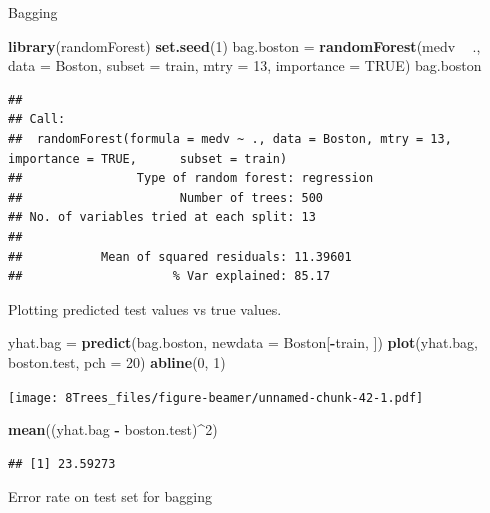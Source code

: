 \documentclass[10pt,ignorenonframetext,]{beamer}
\newenvironment{Shaded}{\begin{snugshade}}{\end{snugshade}}
\newcommand{\KeywordTok}[1]{\textcolor[rgb]{0.13,0.29,0.53}{\textbf{#1}}}
\newcommand{\DataTypeTok}[1]{\textcolor[rgb]{0.13,0.29,0.53}{#1}}
\newcommand{\DecValTok}[1]{\textcolor[rgb]{0.00,0.00,0.81}{#1}}
\newcommand{\StringTok}[1]{\textcolor[rgb]{0.31,0.60,0.02}{#1}}
\newcommand{\OtherTok}[1]{\textcolor[rgb]{0.56,0.35,0.01}{#1}}
\newcommand{\OperatorTok}[1]{\textcolor[rgb]{0.81,0.36,0.00}{\textbf{#1}}}
\newcommand{\NormalTok}[1]{#1}
\begin{document}
\begin{frame}[fragile]

\begin{block}{Bagging}

\begin{Shaded}
\begin{Highlighting}[]
\KeywordTok{library}\NormalTok{(randomForest)}
\KeywordTok{set.seed}\NormalTok{(}\DecValTok{1}\NormalTok{)}
\NormalTok{bag.boston =}\StringTok{ }\KeywordTok{randomForest}\NormalTok{(medv }\OperatorTok{~}\StringTok{ }\NormalTok{., }\DataTypeTok{data =}\NormalTok{ Boston, }\DataTypeTok{subset =}\NormalTok{ train, }\DataTypeTok{mtry =} \DecValTok{13}\NormalTok{, }
    \DataTypeTok{importance =} \OtherTok{TRUE}\NormalTok{)}
\NormalTok{bag.boston}
\end{Highlighting}
\end{Shaded}

\begin{verbatim}
## 
## Call:
##  randomForest(formula = medv ~ ., data = Boston, mtry = 13, importance = TRUE,      subset = train) 
##                Type of random forest: regression
##                      Number of trees: 500
## No. of variables tried at each split: 13
## 
##           Mean of squared residuals: 11.39601
##                     % Var explained: 85.17
\end{verbatim}

Plotting predicted test values vs true values.

\begin{Shaded}
\begin{Highlighting}[]
\NormalTok{yhat.bag =}\StringTok{ }\KeywordTok{predict}\NormalTok{(bag.boston, }\DataTypeTok{newdata =}\NormalTok{ Boston[}\OperatorTok{-}\NormalTok{train, ])}
\KeywordTok{plot}\NormalTok{(yhat.bag, boston.test, }\DataTypeTok{pch =} \DecValTok{20}\NormalTok{)}
\KeywordTok{abline}\NormalTok{(}\DecValTok{0}\NormalTok{, }\DecValTok{1}\NormalTok{)}
\end{Highlighting}
\end{Shaded}

\texttt{[image: 8Trees\_files/figure-beamer/unnamed-chunk-42-1.pdf]}

\begin{Shaded}
\begin{Highlighting}[]
\KeywordTok{mean}\NormalTok{((yhat.bag }\OperatorTok{-}\StringTok{ }\NormalTok{boston.test)}\OperatorTok{^}\DecValTok{2}\NormalTok{)}
\end{Highlighting}
\end{Shaded}

\begin{verbatim}
## [1] 23.59273
\end{verbatim}

Error rate on test set for bagging

\end{block}

\end{frame}
\end{document}

